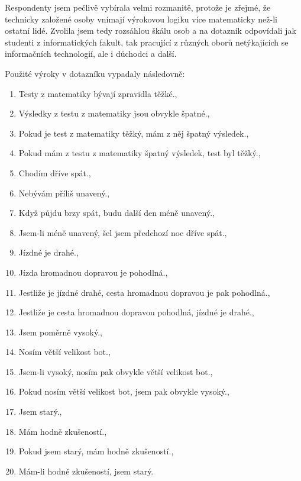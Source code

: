 Respondenty jsem pečlivě vybírala velmi rozmanitě, protože je zřejmé, že technicky založené osoby vnímají výrokovou logiku více matematicky než-li ostatní lidé. Zvolila jsem tedy rozsáhlou škálu osob a na dotazník odpovídali jak studenti z informatických fakult, tak pracující z r\r uzných obor\r u netýkajících se informačních technologií, ale i d\r uchodci a další.

Použité výroky v dotazníku vypadaly následovně:
\begin{enumerate}
       \item  \clqq Testy z matematiky bývají zpravidla těžké.\crqq  , 
       \item  \clqq Výsledky z testu z matematiky jsou obvykle špatné.\crqq  ,
       \item  \clqq Pokud je test z matematiky těžký, mám z něj špatný výsledek.\crqq  ,
       \item  \clqq Pokud mám z testu z matematiky špatný výsledek, test byl těžký.\crqq  ,
       \item  \clqq Chodím dříve spát.\crqq  ,
       \item  \clqq Nebývám příliš unavený.\crqq  ,
       \item  \clqq Když půjdu brzy spát, budu další den méně unavený.\crqq  ,
       \item  \clqq Jsem-li méně unavený, šel jsem předchozí noc dříve spát.\crqq  ,
       \item  \clqq Jízdné je drahé.\crqq  ,
       \item  \clqq Jízda hromadnou dopravou je pohodlná.\crqq  ,
       \item  \clqq Jestliže je jízdné drahé, cesta hromadnou dopravou je pak pohodlná.\crqq,
       \item  \clqq Jestliže je cesta hromadnou dopravou pohodlná, jízdné je drahé.\crqq  ,
       \item  \clqq Jsem poměrně vysoký.\crqq  ,
       \item  \clqq Nosím větší velikost bot.\crqq  ,
       \item  \clqq Jsem-li vysoký, nosím pak obvykle větší velikost bot.\crqq  ,
       \item  \clqq Pokud nosím větší velikost bot, jsem pak obvykle vysoký.\crqq  ,
       \item  \clqq Jsem starý.\crqq,
       \item  \clqq Mám hodně zkušeností.\crqq,
       \item  \clqq Pokud jsem starý, mám hodně zkušeností.\crqq,
       \item  \clqq Mám-li hodně zkušeností, jsem starý.\crqq 
\end{enumerate}

